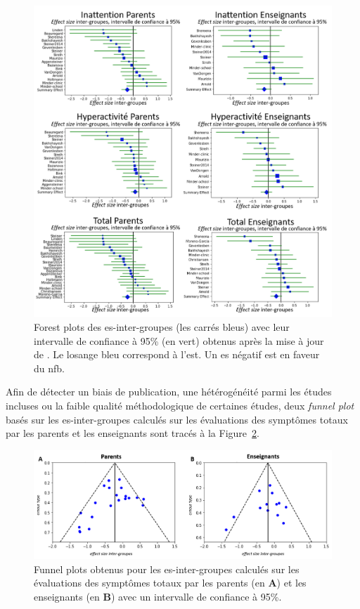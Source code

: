 \begin{figure}[h!]
  \centering
	\includegraphics[width=1\linewidth]{figures/chapter-2/meta-analysis-forest-plots} 
  \caption{Forest plots des \gls{es}-inter-groupes (les carrés bleus) avec leur intervalle de confiance à 95\% (en vert) obtenus après la mise à jour de 
	\citet{Cortese2016}. Le losange bleu correspond à l'\gls{est}.
	Un \gls{es} négatif est en faveur du \gls{nfb}.}
  \label{Figure:meta_analysis_forest_plots}
\end{figure}

Afin de détecter un biais de publication, une hétérogénéité parmi les études incluses ou la faible qualité méthodologique de certaines études, 
deux \textit{funnel plot} basés sur les \gls{es}-inter-groupes calculés sur les évaluations des symptômes totaux par les parents et les enseignants sont 
tracés à la Figure~\ref{Figure:meta_analysis_funnel_plots}. 

\begin{figure}[h!]
  \centering
	\includegraphics[width=1\linewidth]{figures/chapter-2/meta-analysis-funnel-plots} 
  \caption{Funnel plots obtenus pour les \gls{es}-inter-groupes calculés sur les évaluations des symptômes totaux par les parents (en \textbf{A}) et 
	les enseignants (en \textbf{B}) avec un intervalle de confiance à 95\%.}
  \label{Figure:meta_analysis_funnel_plots}
\end{figure}

